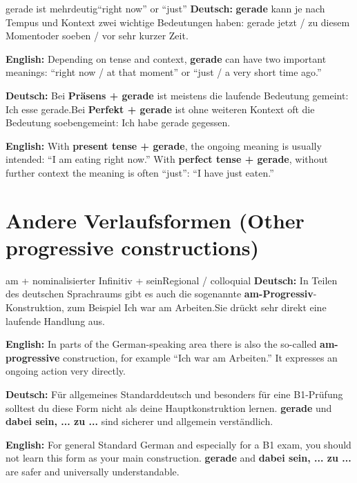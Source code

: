 \documentclass[a4paper,11pt]{article}
\newcommand{\GermanText}[1]{\textbf{Deutsch: }#1\par}
\newcommand{\EnglishText}[1]{{\small\color{SoftGray}\textbf{English: }#1\par}}
\begin{document}
        \begin{grammarentry}{gerade ist mehrdeutig}{``right now'' or ``just''}
            \GermanText{\textbf{gerade} kann je nach Tempus und Kontext zwei wichtige Bedeutungen haben: \glqq gerade jetzt / zu diesem Moment\grqq oder \glqq soeben / vor sehr kurzer Zeit\grqq.}
            \EnglishText{Depending on tense and context, \textbf{gerade} can have two important meanings: ``right now / at that moment'' or ``just / a very short time ago.''}

            \GermanText{Bei \textbf{Präsens + gerade} ist meistens die laufende Bedeutung gemeint: \glqq Ich esse gerade.\grqq Bei \textbf{Perfekt + gerade} ist ohne weiteren Kontext oft die Bedeutung \glqq soeben\grqq gemeint: \glqq Ich habe gerade gegessen.\grqq}
            \EnglishText{With \textbf{present tense + gerade}, the ongoing meaning is usually intended: ``I am eating right now.'' With \textbf{perfect tense + gerade}, without further context the meaning is often ``just'': ``I have just eaten.''}
        \end{grammarentry}

    \section{Andere Verlaufsformen \textnormal{(Other progressive constructions)}}

        \begin{grammarentry}{am + nominalisierter Infinitiv + sein}{Regional / colloquial}
            \GermanText{In Teilen des deutschen Sprachraums gibt es auch die sogenannte \textbf{am-Progressiv}-Konstruktion, zum Beispiel \glqq Ich war am Arbeiten.\grqq Sie drückt sehr direkt eine laufende Handlung aus.}
            \EnglishText{In parts of the German-speaking area there is also the so-called \textbf{am-progressive} construction, for example ``Ich war am Arbeiten.'' It expresses an ongoing action very directly.}

            \GermanText{Für allgemeines Standarddeutsch und besonders für eine B1-Prüfung solltest du diese Form nicht als deine Hauptkonstruktion lernen. \textbf{gerade} und \textbf{dabei sein, ... zu ...} sind sicherer und allgemein verständlich.}
            \EnglishText{For general Standard German and especially for a B1 exam, you should not learn this form as your main construction. \textbf{gerade} and \textbf{dabei sein, ... zu ...} are safer and universally understandable.}
        \end{grammarentry}
\end{document}
